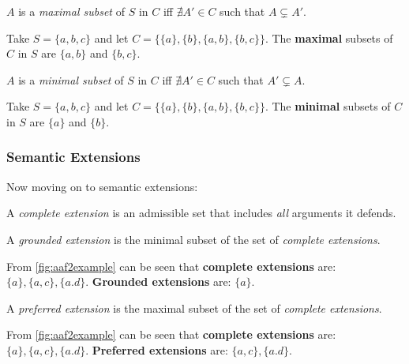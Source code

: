             \begin{definition}
                $A$ is a \textit{maximal subset} of $S$ in $C$ iff $\nexists A' \in C$ such that $A \subsetneq A'$.
                \label{definition:definition5}
            \end{definition}
            \begin{exa}
                Take $S = \{a, b, c\}$ and let $C = \{\{a\}, \{b\}, \{a, b\}, \{b, c\}\}$. The \textbf{maximal} subsets of $C$ in $S$ are $\{a, b\}$ and $\{b, c\}$.
                \label{exa:example5}
            \end{exa}
            
            \begin{definition}
                $A$ is a \textit{minimal subset} of $S$ in $C$ iff $\nexists A' \in C$ such that $A' \subsetneq A$.
                \label{definition:definition6}
            \end{definition}
            \begin{exa}
                Take $S = \{a, b, c\}$ and let $C = \{\{a\}, \{b\}, \{a, b\}, \{b, c\}\}$. The \textbf{minimal} subsets of $C$ in $S$ are $\{a\}$ and $\{b\}$.
                \label{exa:example6}
            \end{exa}
        
        \subsubsection{Semantic Extensions}
            Now moving on to semantic extensions:
            \begin{definition}
                A \textit{complete extension} is an admissible set that includes \textit{all} arguments it defends.
                \label{definition:definition7}
            \end{definition}
            
            \begin{definition}
                A \textit{grounded extension} is the minimal subset of the set of \textit{complete extensions}.
                \label{definition:definition8}
            \end{definition}
            \begin{exa}
                From \autoref{fig:aaf2example} can be seen that \textbf{complete extensions} are: $\{a\}, \{a, c\}, \{a. d\}$. \textbf{Grounded extensions} are: $\{a\}$.
                \label{exa:example8}
            \end{exa}
            
            \begin{definition}
                A \textit{preferred extension} is the maximal subset of the set of \textit{complete extensions}.
                \label{definition:definition9}
            \end{definition}
            \begin{exa}
                From \autoref{fig:aaf2example} can be seen that \textbf{complete extensions} are: $\{a\}, \{a, c\}, \{a. d\}$. \textbf{Preferred extensions} are: $\{a, c\}, \{a. d\}$.
                \label{exa:example9}
            \end{exa}
        
